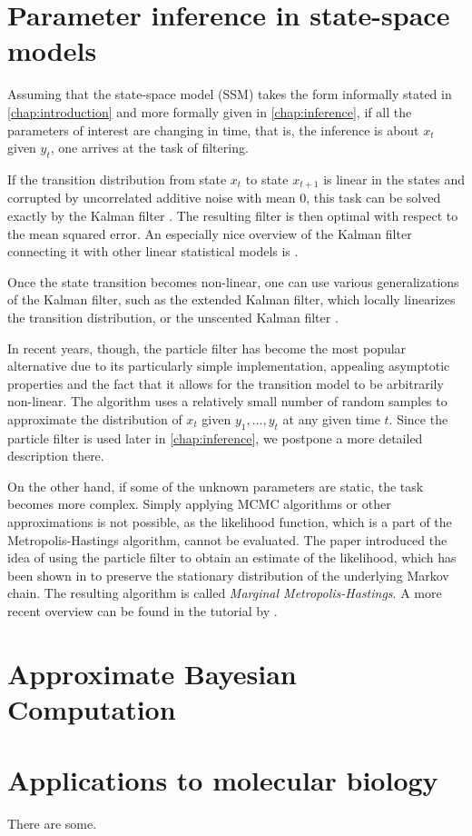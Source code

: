 \section{Parameter inference in state-space models}
Assuming that the state-space model (SSM) takes the form informally stated in \autoref{chap:introduction} and more formally given in \autoref{chap:inference}, if all the parameters of interest are changing in time, that is, the inference is about $x_t$ given $y_t$, one arrives at the task of filtering.

If the transition distribution from state $x_t$ to state $x_{t+1}$ is linear in the states and corrupted by uncorrelated additive noise with mean 0, this task can be solved exactly by the Kalman filter \citep{kalman}. The resulting filter is then optimal with respect to the mean squared error. An especially nice overview of the Kalman filter connecting it with other linear statistical models is \cite{lds}.

Once the state transition becomes non-linear, one can use various generalizations of the Kalman filter, such as the extended Kalman filter, which locally linearizes the transition distribution, or the unscented Kalman filter \citep{ukf}.

In recent years, though, the particle filter \citep{particle-filter} has become the most popular alternative due to its particularly simple implementation, appealing asymptotic properties and the fact that it allows for the transition model to be arbitrarily non-linear. The algorithm uses a relatively small number of random samples to approximate the distribution of $x_t$ given $y_1, \ldots, y_t$ at any given time $t$. Since the particle filter is used later in \autoref{chap:inference}, we postpone a more detailed description there.

On the other hand, if some of the unknown parameters are static, the task becomes more complex. Simply applying MCMC algorithms or other approximations is not possible, as the likelihood function, which is a part of the Metropolis-Hastings algorithm, cannot be evaluated. The paper \cite{andrieu} introduced the idea of using the particle filter to obtain an estimate of the likelihood, which has been shown in \cite{del-moral} to preserve the stationary distribution of the underlying Markov chain. The resulting algorithm is called \emph{Marginal Metropolis-Hastings}. A more recent overview can be found in the tutorial by \cite{schoen}.

\section{Approximate Bayesian Computation}

\section{Applications to molecular biology}
There are some.